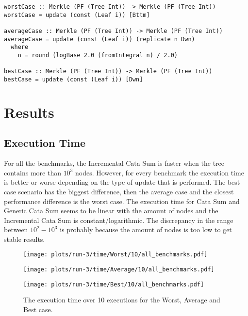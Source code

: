 \begin{verbatim}
worstCase :: Merkle (PF (Tree Int)) -> Merkle (PF (Tree Int))
worstCase = update (const (Leaf i)) [Bttm]

averageCase :: Merkle (PF (Tree Int)) -> Merkle (PF (Tree Int))
averageCase = update (const (Leaf i)) (replicate n Dwn)
  where
    n = round (logBase 2.0 (fromIntegral n) / 2.0)

bestCase :: Merkle (PF (Tree Int)) -> Merkle (PF (Tree Int))
bestCase = update (const (Leaf i)) [Dwn]
\end{verbatim}

\newpage
\section{Results}

\subsection{Execution Time}

For all the benchmarks, the Incremental Cata Sum is faster when the tree contains more than $10^3$ nodes. However, for every benchmark the execution time is better or worse depending on the type of update that is performed. The best case scenario has the biggest difference, then the average case and the closest performance difference is the worst case. The execution time for Cata Sum and Generic Cata Sum seems to be linear with the amount of nodes and the Incremental Cata Sum is constant/logarithmic. The discrepancy in the range between $10^2 - 10^3$ is probably because the amount of nodes is too low to get stable results.

\begin{figure}[H]
  \begin{minipage}{.5\textwidth}
    \centering
    \texttt{[image: plots/run-3/time/Worst/10/all\_benchmarks.pdf]}  
  \end{minipage}
  \begin{minipage}{.5\textwidth}
    \centering
    \texttt{[image: plots/run-3/time/Average/10/all\_benchmarks.pdf]}  
  \end{minipage}
  \begin{center}
    \begin{minipage}[c]{.5\textwidth}
      \centering
      \texttt{[image: plots/run-3/time/Best/10/all\_benchmarks.pdf]}  
    \end{minipage}
  \end{center}
  \caption{The execution time over 10 executions for the Worst, Average and Best case.}
\end{figure}

